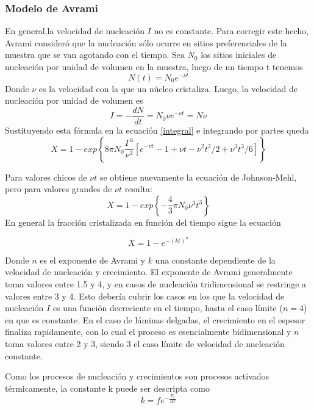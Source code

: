 \documentclass{article}
\theoremstyle{definition}
\theoremstyle{remark}
\begin{document}
\subsubsection{Modelo de Avrami}
En general,la velocidad de nucleación $I$ no es constante. Para corregir este hecho, Avrami consideró que la nucleación sólo ocurre en sitios preferenciales de la muestra que se van agotando con el tiempo. Sea $N_0$ los sitios iniciales de nucleación por unidad de volumen en la muestra, luego de un tiempo t tenemos
\begin{equation}
	N(t) = N_0e^{-\nu t}
\end{equation}
Donde $\nu$ es la velocidad con la que un núcleo cristaliza. Luego, la velocidad de nucleación por unidad de volumen es 
\begin{equation}
	I = -\frac{dN}{dt} = N_0\nu e^{-\nu t} = N\nu
\end{equation}
Sustituyendo esta fórmula en la ecuación \ref{integral} e integrando por partes queda
\begin{equation}
	X = 1-exp \left\lbrace 8\pi N_0\frac{\Gamma^3}{\nu^3} \left[ e^{-\nu t} -1+\nu t -\nu^2t^2/2 + \nu^3 t^3/6 \right] \right\rbrace
\end{equation}

Para valores chicos de $\nu t$ se obtiene nuevamente la ecuación de Johnson-Mehl, pero para valores grandes de $\nu t$ resulta:
\begin{equation}
	X = 1 - exp\left\lbrace -\frac{4}{3} \pi N_0 \nu^3 t^3 \right\rbrace
\end{equation}
En general la fracción cristalizada en función del tiempo sigue la ecuación

\begin{equation}
	X = 1 - e^{-(kt)^n}
\end{equation}

Donde $n$ es el exponente de Avrami y $k$ una constante dependiente de la velocidad de nucleación y crecimiento.
	El exponente de Avrami generalmente toma valores entre 1.5 y 4, y en casos de nucleación tridimensional se restringe a valores entre 3 y 4. Esto debería cubrir los casos en los que la velocidad de nucleación $I$ es una función decreciente en el tiempo, hasta el caso límite ($n = 4$) en que es constante. En el caso de láminas delgadas, el crecimiento en el espesor finaliza rapidamente, con lo cual el proceso es esencialmente bidimensional y $n$ toma valores entre 2 y 3, siendo 3 el caso límite de velocidad de nucleación constante. 
	
Como los procesos de nucleación y crecimientos son procesos activados térmicamente, la constante k puede ser descripta como
\begin{equation}
\label{kvalue}
	k=fe^{-\frac{E_c}{RT}}
\end{equation}
\end{document}
